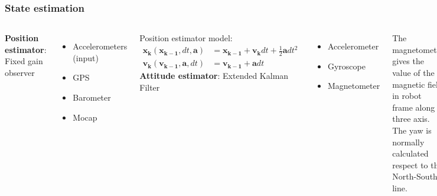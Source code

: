 \documentclass[xcolor=dvipsnames]{beamer}
\begin{document}
\begin{frame}[t]
\frametitle{State estimation}

\begin{columns}[t]
\textbf{Position estimator}:
Fixed gain observer
\begin{itemize}
\item Accelerometers (input)
\item GPS
\item Barometer
\item Mocap
\end{itemize}
\vspace{1em}
Position estimator model:
\begin{equation*}
\begin{aligned}
	\boldsymbol{x_k}(\boldsymbol{x_{k-1}}, dt , \boldsymbol{a})& = \boldsymbol{x_{k-1}} + \boldsymbol{v_k}dt + \frac{1}{2}\boldsymbol{a} dt^2 \\
	 \boldsymbol{v_k} ( \boldsymbol{v_{k-1}} ,\boldsymbol{a} , dt)& = \boldsymbol{v_{k-1}} + \boldsymbol{a}dt
	 \end{aligned}
\end{equation*}
\textbf{Attitude estimator}:
Extended Kalman Filter
\begin{itemize}
\item Accelerometer
\item Gyroscope
\item Magnetometer
\end{itemize}
\vspace{2em}
 The magnetometer gives the value of the magnetic field in robot frame along three axis. The yaw is normally calculated respect to the North-South line.
\end{columns}



\end{frame}
\end{document}

